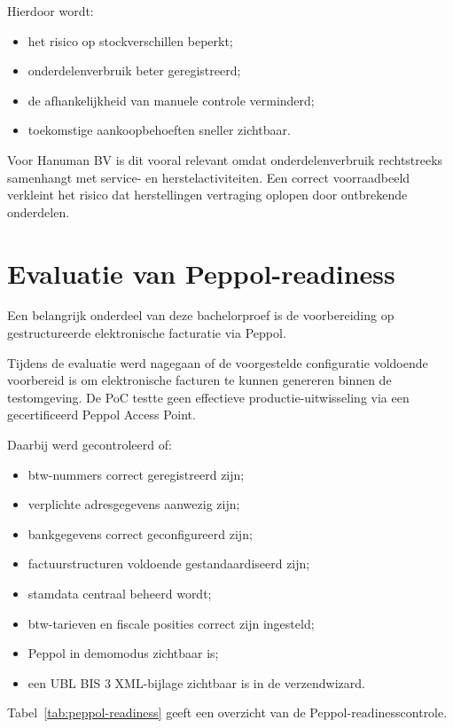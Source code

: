 Hierdoor wordt:
\begin{itemize}
    \item het risico op stockverschillen beperkt;
    \item onderdelenverbruik beter geregistreerd;
    \item de afhankelijkheid van manuele controle verminderd;
    \item toekomstige aankoopbehoeften sneller zichtbaar.
\end{itemize}

Voor Hanuman BV is dit vooral relevant omdat onderdelenverbruik rechtstreeks samenhangt met service- en herstelactiviteiten. Een correct voorraadbeeld verkleint het risico dat herstellingen vertraging oplopen door ontbrekende onderdelen.

\section{Evaluatie van Peppol-readiness}
\label{sec:peppol-evaluatie}

Een belangrijk onderdeel van deze bachelorproef is de voorbereiding op gestructureerde elektronische facturatie via Peppol.

Tijdens de evaluatie werd nagegaan of de voorgestelde configuratie voldoende voorbereid is om elektronische facturen te kunnen genereren binnen de testomgeving. De PoC testte geen effectieve productie-uitwisseling via een gecertificeerd Peppol Access Point.

Daarbij werd gecontroleerd of:
\begin{itemize}
    \item btw-nummers correct geregistreerd zijn;
    \item verplichte adresgegevens aanwezig zijn;
    \item bankgegevens correct geconfigureerd zijn;
    \item factuurstructuren voldoende gestandaardiseerd zijn;
    \item stamdata centraal beheerd wordt;
    \item btw-tarieven en fiscale posities correct zijn ingesteld;
    \item Peppol in demomodus zichtbaar is;
    \item een UBL BIS 3 XML-bijlage zichtbaar is in de verzendwizard.
\end{itemize}

Tabel~\ref{tab:peppol-readiness} geeft een overzicht van de Peppol-readinesscontrole.

